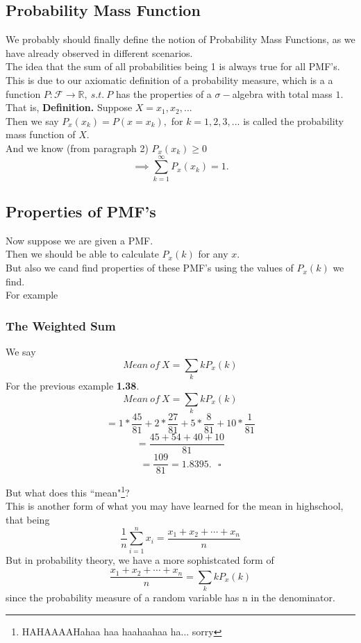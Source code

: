 \documentclass[12pt]{book}
\begin{document}
\subsection{Probability Mass Function}
We probably should finally define the notion of Probability Mass Functions, as we have already observed in different scenarios. \\

The idea that the sum of all probabilities being 1 is always true for all PMF's. 
This is due to our axiomatic definition of a probability measure, which is a a function $P:\mathcal{F} \to \mathbb{R},~s.t.~P$ has the properties of a $\sigma-$algebra with total mass $1$.\\

That is, 
\textbf{Definition.} Suppose $X=x_{1},x_{2}, ...$\\
Then we say $P_{x}(x_{k})=P(x=x_{k}),$ for $k=1,2,3,...$ is called the probability mass function of $X$.\\
And we know (from paragraph 2) $P_{x}(x_{k})\geq 0$
$$\implies{} \sum\limits_{k=1}^{\infty} P_{x} (x_{k})=1.$$


\subsection{Properties of PMF's}
Now suppose we are given a PMF.\\
Then we should be able to calculate $P_{x}(k)$ for any $x$.\\
But also we cand find properties of these PMF's using the values of $P_{x}(k)$ we find.\\
For example

\subsubsection{The Weighted Sum}
We say
$$Mean~of~X=\sum\limits_{k} kP_{x}(k)$$
\noindent For the previous example \textbf{1.38}.
$$Mean~of~X=\sum\limits_{k} kP_{x}(k)$$
$$= 1* \frac{45}{81} + 2* \frac{27}{81} + 5* \frac{8}{81} + 10* \frac{1}{81}$$
$$= \frac{45+54+40+10}{81}$$
$$=\frac{109}{81}=1.8395.~~~\square$$


\noindent But what does this ``mean"\footnote{HAHAAAAHahaa haa haahaahaa ha... sorry}?\\

\noindent This is another form of what you may have learned for the mean in highschool, that being 
$$\frac{1}{n}\sum\limits_{i=1}^{n} x_{i}= \frac{x_{1}+x_{2}+\cdots+x_{n}}{n}$$
But in probability theory, we have a more sophistcated form of 
$$\frac{x_{1}+x_{2}+\cdots+x_{n}}{n}=\sum\limits_{k} kP_{x}(k)$$
since the probability measure of a random variable has n in the denominator. \\
\end{document}
